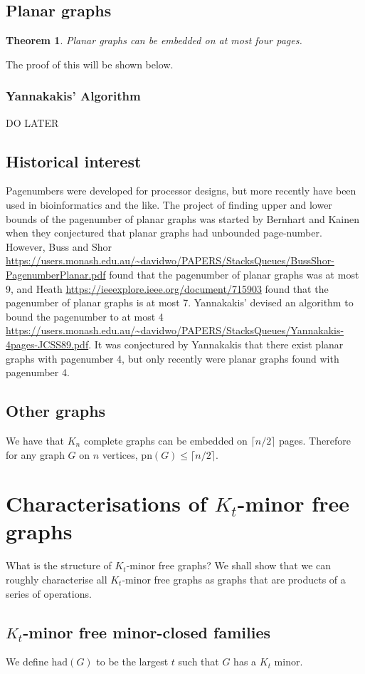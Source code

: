 \documentclass[]{article}
\newcommand{\had}{\text{had}}
\newcommand{\pn}{\text{pn}}
\newtheorem{theorem}{Theorem}
\theoremstyle{definition}
\numberwithin{theorem}{section}
\numberwithin{equation}{section}
\begin{document}
\subsection{Planar graphs}
\begin{theorem}
	Planar graphs can be embedded on at most four pages.
\end{theorem}
The proof of this will be shown below.
\subsubsection{Yannakakis' Algorithm}
DO LATER


\subsection{Historical interest}
Pagenumbers were developed for processor designs, but more recently have been used in bioinformatics and the like. 
The project of finding upper and lower bounds of the pagenumber of planar graphs was started by Bernhart and Kainen when they conjectured that planar graphs had unbounded page-number. However, Buss and Shor \url{https://users.monash.edu.au/~davidwo/PAPERS/StacksQueues/BussShor-PagenumberPlanar.pdf} found that the pagenumber of planar graphs was at most 9, and Heath \url{https://ieeexplore.ieee.org/document/715903} found that the pagenumber of planar graphs is at most 7. Yannakakis' devised an algorithm to bound the pagenumber to at most 4 \url{https://users.monash.edu.au/~davidwo/PAPERS/StacksQueues/Yannakakis-4pages-JCSS89.pdf}. It was conjectured by Yannakakis that there exist planar graphs with pagenumber 4, but only recently were planar graphs found with pagenumber 4. 
\subsection{Other graphs}
We have that $K_n$ complete graphs can be embedded on $\lceil n/2 \rceil$ pages. Therefore for any graph $G$ on $n$ vertices, $\pn(G) \leq \lceil n/2 \rceil$. 

\section{Characterisations of $K_t$-minor free graphs}
What is the structure of $K_t$-minor free graphs? We shall show that we can roughly characterise all $K_t$-minor free graphs as graphs that are products of a series of operations. 
\subsection{$K_t$-minor free minor-closed families}
We define $\had(G)$ to be the largest $t$ such that $G$ has a $K_t$ minor. 
\end{document}

